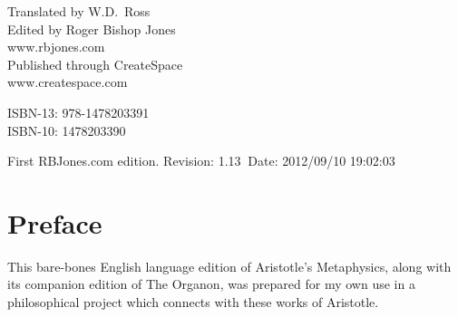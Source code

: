 \begin{titlepage}
\maketitle

\hspace{2in}

\vfill

\begin{centering}

Translated by W.D.~Ross\\
\vspace{0.2in}
Edited by Roger Bishop Jones\\
www.rbjones.com\\
\vspace{0.2in}
Published through CreateSpace\\
www.createspace.com\\
\vspace{0.2in}

ISBN-13: 978-1478203391\\
ISBN-10: 1478203390

\vspace{0.2in}

{\footnotesize

First RBJones.com edition. $ $Revision: 1.13 $~$Date: 2012/09/10 19:02:03 $ $

}%

\end{centering}

\thispagestyle{empty}
\end{titlepage}


{\parskip=0pt\tableofcontents}
\vfill

\pagebreak

\chapter*{Preface}

This bare-bones English language edition of Aristotle's Metaphysics, along with its companion edition of The Organon, was prepared for my own use in a philosophical project which connects with these works of Aristotle.

